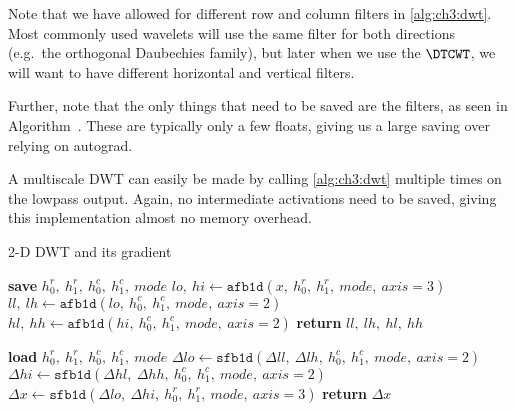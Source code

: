 Note that we have allowed for different row and column
filters in \autoref{alg:ch3:dwt}. Most commonly used wavelets will use the same
filter for both directions (e.g.\ the orthogonal Daubechies family), but later
when we use the $\DTCWT$, we will want to have different horizontal and vertical
filters.

Further, note that the only things that
need to be saved are the filters, as seen in
Algorithm~. These are typically only a
few floats, giving us a large saving over relying on autograd.

A multiscale DWT can easily be made by calling \autoref{alg:ch3:dwt}
multiple times on the lowpass output. Again, no intermediate activations need to be
saved, giving this implementation almost no memory overhead.

\begin{algorithm}[tb]
\caption{2-D DWT and its gradient}\label{alg:ch3:dwt}
\begin{algorithmic}[1]
  \State \textbf{save} $h_0^r,\ h_1^r,\ h_0^c,\ h_1^c,\ mode$  \label{line:ch3:dwt_save}
  \State $lo,\ hi \gets \mathtt{afb1d}(x,\ h_0^r,\ h_1^r,\ mode,\ axis=3)$ 
  \State $ll,\ lh \gets \mathtt{afb1d}(lo,\ h_0^c,\ h_1^c,\ mode,\ axis=2)$ 
  \State $hl,\ hh \gets \mathtt{afb1d}(hi,\ h_0^c,\ h_1^c,\ mode,\ axis=2)$ 
  \State \textbf{return} $ll,\ lh,\ hl,\ hh$
\EndFunction
\end{algorithmic}\vspace{10pt}
\begin{algorithmic}[1]
  \State \textbf{load} $h_0^r,\ h_1^r,\ h_0^c,\ h_1^c,\ mode$
  \State $\Delta lo \gets \mathtt{sfb1d}(\Delta ll,\ \Delta lh,\ h_0^c,\ h_1^c,\ mode,\ axis=2) $
  \State $\Delta hi \gets \mathtt{sfb1d}(\Delta hl,\ \Delta hh,\ h_0^c,\ h_1^c,\ mode,\ axis=2) $
  \State $\Delta x \gets \mathtt{sfb1d}(\Delta lo,\ \Delta hi,\ h_0^r,\ h_1^r,\ mode,\ axis=3) $
  \State \textbf{return} $\Delta x$
\EndFunction
\end{algorithmic}
\end{algorithm}

